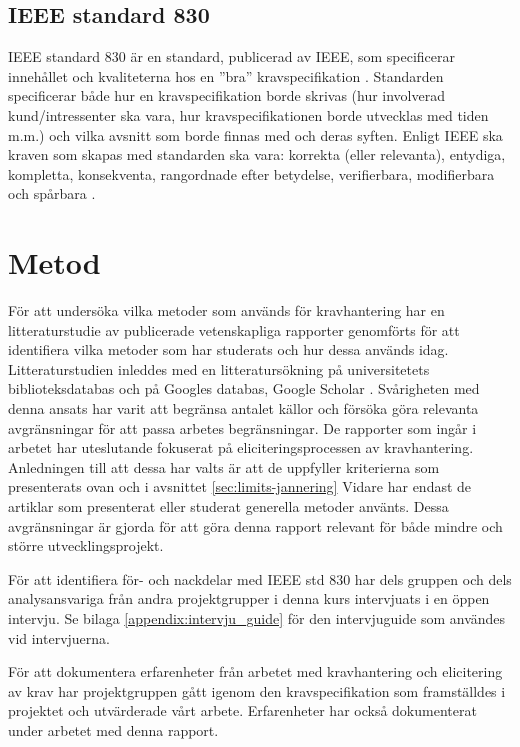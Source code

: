 \subsection{IEEE standard 830}
IEEE standard 830 är en standard, publicerad av IEEE, som specificerar innehållet och kvaliteterna hos en ”bra” kravspecifikation \cite{ieee1998ieee}. Standarden specificerar både hur en kravspecifikation borde skrivas (hur involverad kund/intressenter ska vara, hur kravspecifikationen borde utvecklas med tiden m.m.) och vilka avsnitt som borde finnas med och deras syften. Enligt IEEE ska kraven som skapas med standarden ska vara: korrekta (eller relevanta), entydiga, kompletta, konsekventa, rangordnade efter betydelse, verifierbara, modifierbara och spårbara \cite{ieee1998ieee}.

\section{Metod}
\label{sec:method-jannering}

För att undersöka vilka metoder som används för kravhantering har en litteraturstudie av publicerade vetenskapliga rapporter genomförts för att identifiera vilka metoder som har studerats och hur dessa används idag. Litteraturstudien inleddes med en litteratursökning  på universitetets biblioteksdatabas och på Googles databas, Google Scholar \cite{google_scholar}. Svårigheten med denna ansats har varit att begränsa antalet källor och försöka göra relevanta avgränsningar för att passa arbetes begränsningar. De rapporter som ingår i arbetet har uteslutande fokuserat på eliciteringsprocessen av kravhantering. Anledningen till att dessa har valts är att de uppfyller kriterierna som presenterats ovan och i avsnittet \ref{sec:limits-jannering} Vidare har endast de artiklar som presenterat eller studerat generella metoder använts. Dessa avgränsningar är gjorda för att göra denna rapport relevant för både mindre och större utvecklingsprojekt.
  
För att identifiera för- och nackdelar med IEEE std 830 \cite{ieee1998ieee} har dels gruppen och dels analysansvariga från andra projektgrupper i denna kurs intervjuats i en öppen intervju. Se bilaga \ref{appendix:intervju_guide} för den intervjuguide som användes vid intervjuerna.

För att dokumentera erfarenheter från arbetet med kravhantering och elicitering av krav har projektgruppen gått igenom den kravspecifikation som framställdes i projektet och utvärderade vårt arbete. Erfarenheter har också dokumenterat under arbetet med denna rapport.




